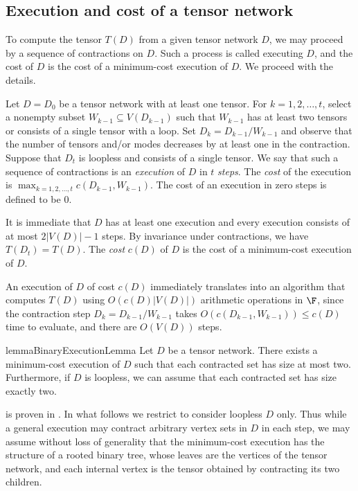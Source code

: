\subsection{Execution and cost of a tensor network}

To compute the tensor $T(D)$ from a given tensor network $D$,
we may proceed by a sequence of contractions on $D$. Such a process is called
executing $D$, and the cost of $D$ is the cost of a minimum-cost execution of $D$. We proceed with the details.

Let $D=D_0$ be a tensor network with at least one tensor.
For $k=1,2,\ldots,t$, select a nonempty
subset $W_{k-1}\subseteq V(D_{k-1})$ such that $W_{k-1}$ has at least two
tensors or consists of a single tensor with a loop.
Set $D_k=D_{k-1}/W_{k-1}$ and observe that the number of tensors and/or modes
decreases by at least one in the contraction.
Suppose that $D_t$ is loopless and consists of a single tensor.
We say that such a sequence of contractions is an \emph{execution} of $D$
in $t$ \emph{steps}.
The \emph{cost} of the execution is
$\max_{k=1,2,\ldots,t} c(D_{k-1},W_{k-1})$.
The cost of an execution in zero steps is defined to be $0$.

It is immediate that $D$ has at least one execution and every
execution consists of at most $2|V(D)|-1$ steps.  By invariance under
contractions, we have $T(D_t) = T(D)$.
The \emph{cost} $c(D)$ of $D$ is the cost of a minimum-cost execution of $D$.

An execution of $D$ of cost $c(D)$ immediately translates into an
algorithm that computes $T(D)$ using $O(c(D)|V(D)|)$ arithmetic
operations in $\F$, since the contraction step $D_{k} =
D_{k-1}/W_{k-1}$ takes $O(c(D_{k-1}, W_{k-1})) \le c(D)$ time to
evaluate, and there are $O(V(D))$ steps.

\begin{restatable}{lemma}{BinaryExecutionLemma}
\label{lem:binary}
Let $D$ be a tensor network.
There exists a minimum-cost execution of $D$ such that each contracted
set has size at most two. Furthermore, if $D$ is loopless,
we can assume that each contracted set has size exactly two.
\end{restatable}

  is proven in .
In what follows we restrict to consider loopless $D$ only.
Thus while a general execution may contract arbitrary vertex sets in
$D$ in each step, we may assume without loss of generality that
the minimum-cost execution has the structure of a rooted binary tree,
whose leaves are the vertices of the tensor network, and each internal
vertex is the tensor obtained by contracting its two children.


